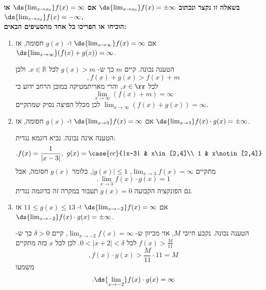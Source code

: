 \textbf{
בשאלה זו נקצר ונכתוב
$\ds{\lim_{x\to x_0}}f(x)=\pm\infty$
אם
$\ds{\lim_{x\to x_0}}f(x)=\infty$
או
$\ds{\lim_{x\to x_0}}f(x)=-\infty$.
\\
הוכיחו או הפריכו
כל אחד מהסעיפים הבאים:
}
\begin{enumerate}
    \item אם
    $\ds{\lim_{x\to \infty}}f(x)=\infty$ ו-
    $g(x)$
    חסומה,
    אז
    $\ds{\lim_{x\to \infty}}(f(x)+g(x))=\infty$.

\ifsol
{}
\begin{solbox}
    הטענה נכונה.
    קיים
    $m$
    כך ש-
    $g(x)>m$
    לכל
    $x\in\mathbb{R}$.
    ולכן
    $$,f(x)+g(x)>f(x)+m$$
    לכל
    $x\in\rr$,
    והרי מאריתמטיקה במובן הרחב ידוע כי
    $$\lim_{x\to \infty} (f(x)+m)=\infty$$
    לכן מכלל הפיצה נסיק שמתקיים
$\lim_{x\to\infty}(f(x)+g(x))=\infty$.
\end{solbox}
\fi

    \item אם
    $\ds{\lim_{x\to 3}}f(x)=\infty$ ו-
    $g(x)$
    חסומה,
    אז
    $\ds{\lim_{x\to 3}}f(x)\cdot g(x)=\pm\infty$.

\ifsol
{}
\begin{solbox}
הטענה אינה נכונה.
נביא דוגמא נגדית:
$$.f(x)=\frac{1}{|x-3|},\ g(x)=\case{cc}{|x-3| & x\in[2,4]\\ 1 & x\notin[2,4]} $$
מתקיים
$\lim_{x\to3}f(x)=\infty$,
$|g(x)|\leq1$,
כלומר
$g(x)$
חסומה,
אבל
$$.\lim_{x\to3}f(x)\cdot g(x)=1$$
גם הפונקציה הקבועה
$g(x)=0$
תעבוד במקרה זה כדוגמה נגדית.
\end{solbox}
\fi

    \item אם
    $\ds{\lim_{x\to -2}}f(x)=\infty$ ו-
    $11\leq g(x)\leq13$
    אז
    $\ds{\lim_{x\to -2}}f(x)\cdot g(x)=\pm\infty$.

\ifsol
{}
\begin{solbox}
הטענה נכונה.
נקבע
חיובי
$M$,
אזי מכיוון ש-
$\displaystyle\lim_{x\to-2}f(x)=\infty$,
קיים
$\delta>0$
כך ש-
$f(x)>\frac{M}{11}$
לכל
$0<|x+2|<\delta$.
לכן לכל $x$ כזה מתקיים
$$,f(x)\cdot g(x)>\frac{M}{11}\cdot11=M$$
משמעו
$$.\ds{\lim_{x\to -2}}f(x)\cdot g(x)=\infty$$
\end{solbox}
\fi


\end{enumerate}
